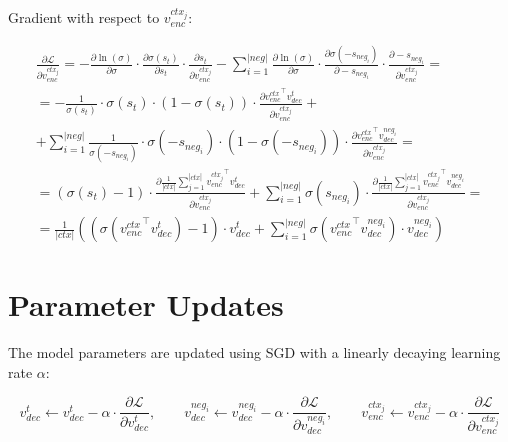 \documentclass[11pt]{article}
\begin{document}
Gradient with respect to $v_{enc}^{ctx_j}$:

\begin{equation}
\begin{gathered}
\frac{\partial \mathcal{L}}{\partial v_{enc}^{ctx_j}} = - \frac{\partial \ln(\sigma)}{\partial \sigma} \cdot \frac{\partial \sigma(s_t)}{\partial s_t} \cdot \frac{\partial s_t}{\partial v_{enc}^{ctx_j}} - \sum_{i=1}^{|neg|} \frac{\partial \ln(\sigma)}{\partial \sigma} \cdot \frac{\partial \sigma(-s_{neg_i})}{\partial -s_{neg_i}} \cdot \frac{\partial -s_{neg_i}}{\partial v_{enc}^{ctx_j}} = \\
= - \frac{1}{\sigma(s_t)} \cdot \sigma(s_t) \cdot (1 - \sigma(s_t)) \cdot \frac{\partial {v^{ctx}_{enc}}^\top v^t_{dec}}{\partial v_{enc}^{ctx_j}} + \\
+ \sum_{i=1}^{|neg|} \frac{1}{\sigma(-s_{neg_i})} \cdot \sigma(-s_{neg_i}) \cdot (1 - \sigma(-s_{neg_i})) \cdot \frac{\partial {v^{ctx}_{enc}}^\top v^{neg_i}_{dec}}{\partial v_{enc}^{ctx_j}} = \\
= (\sigma(s_t) - 1) \cdot \frac{\partial \frac{1}{|ctx|} \sum_{j=1}^{|ctx|} {v^{ctx_j}_{enc}}^\top v^t_{dec}}{\partial v^{ctx_j}_{enc}} + \sum_{i = 1}^{|neg|} \sigma(s_{neg_i}) \cdot \frac{\partial \frac{1}{|ctx|} \sum_{j=1}^{|ctx|} {v^{ctx_j}_{enc}}^\top v^{neg_i}_{dec}}{\partial v^{ctx_j}_{enc}} = \\
= \frac{1}{|ctx|}\left((\sigma({v^{ctx}_{enc}}^\top v^t_{dec}) - 1) \cdot v^{t}_{dec} + \sum_{i = 1}^{|neg|} \sigma({v^{ctx}_{enc}}^\top v^{neg_i}_{dec}) \cdot v^{neg_i}_{dec}\right)
\end{gathered}
\end{equation}

\section{Parameter Updates}

The model parameters are updated using SGD with a linearly decaying learning rate $\alpha$:

\begin{equation}
    v_{dec}^t \leftarrow v_{dec}^t - \alpha \cdot \frac{\partial \mathcal{L}}{\partial v_{dec}^t}, \qquad
    v_{dec}^{neg_i} \leftarrow v_{dec}^{neg_i} - \alpha \cdot \frac{\partial \mathcal{L}}{\partial v_{dec}^{neg_i}}, \qquad
    v_{enc}^{ctx_j} \leftarrow v_{enc}^{ctx_j} - \alpha \cdot \frac{\partial \mathcal{L}}{\partial v_{enc}^{ctx_j}}
\end{equation}
\end{document}
